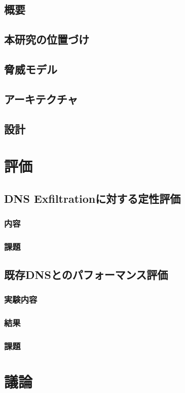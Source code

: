 \documentclass[12pt]{jarticle} %
\begin{document}
\subsection{概要}
\subsection{本研究の位置づけ}
\subsection{脅威モデル}
\subsection{アーキテクチャ}
\subsection{設計}


\newpage
\section{評価}
\subsection{DNS Exfiltrationに対する定性評価}
\subsubsection{内容}
\subsubsection{課題}
\subsection{既存DNSとのパフォーマンス評価}
\subsubsection{実験内容}
\subsubsection{結果}
\subsubsection{課題}

\newpage
\section{議論}
\end{document}
